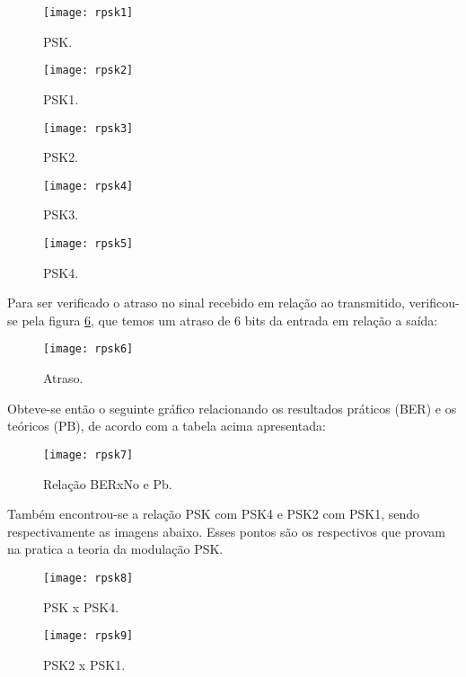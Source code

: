\begin{figure}[H]
    \centering
    \texttt{[image: rpsk1]}
    \caption{PSK.}
    \label{fig:rpsk1}
\end{figure}

\begin{figure}[H]
    \centering
    \texttt{[image: rpsk2]}
    \caption{PSK1.}
    \label{fig:rpsk2}
\end{figure}

\begin{figure}[H]
    \centering
    \texttt{[image: rpsk3]}
    \caption{PSK2.}
    \label{fig:rpsk3}
\end{figure}

\begin{figure}[H]
    \centering
    \texttt{[image: rpsk4]}
    \caption{PSK3.}
    \label{fig:rpsk4}
\end{figure}

\begin{figure}[H]
    \centering
    \texttt{[image: rpsk5]}
    \caption{PSK4.}
    \label{fig:rpsk5}
\end{figure}

Para ser verificado o atraso no sinal recebido em relação ao transmitido, verificou-se pela figura \ref{fig:rpsk6}, que temos um atraso de 6 bits da entrada em relação a saída:
\begin{figure}[H]
    \centering
    \texttt{[image: rpsk6]}
    \caption{Atraso.}
    \label{fig:rpsk6}
\end{figure}


Obteve-se então o seguinte gráfico relacionando os resultados práticos (BER) e os teóricos (PB), de acordo com a tabela acima apresentada:

\begin{figure}[H]
    \centering
    \texttt{[image: rpsk7]}
    \caption{Relação BERxNo e Pb.}
    \label{fig:rpsk7}
\end{figure}

Também encontrou-se a relação PSK com PSK4 e PSK2 com PSK1, sendo respectivamente as imagens abaixo. Esses pontos são os respectivos que provam na pratica a teoria da modulação PSK.

\begin{figure}[H]
    \centering
    \texttt{[image: rpsk8]}
    \caption{PSK x PSK4.}
    \label{fig:rpsk8}
\end{figure}

\begin{figure}[H]
    \centering
    \texttt{[image: rpsk9]}
    \caption{PSK2 x PSK1.}
    \label{fig:rpsk9}
\end{figure}

